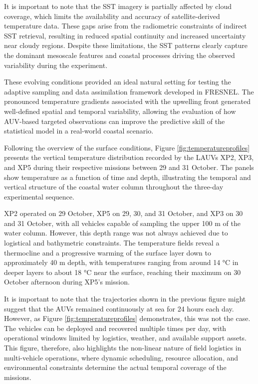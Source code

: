 It is important to note that the SST imagery is partially affected by cloud coverage, which limits the availability and accuracy of satellite-derived temperature data. These gaps arise from the radiometric constraints of indirect SST retrieval, resulting in reduced spatial continuity and increased uncertainty near cloudy regions. Despite these limitations, the SST patterns clearly capture the dominant mesoscale features and coastal processes driving the observed variability during the experiment.

These evolving conditions provided an ideal natural setting for testing the adaptive sampling and data assimilation framework developed in FRESNEL. The pronounced temperature gradients associated with the upwelling front generated well-defined spatial and temporal variability, allowing the evaluation of how AUV-based targeted observations can improve the predictive skill of the statistical model in a real-world coastal scenario.

Following the overview of the surface conditions, Figure \ref{fig:temperatureprofiles} presents the vertical temperature distribution recorded by the LAUVs XP2, XP3, and XP5 during their respective missions between 29 and 31 October. The panels show temperature as a function of time and depth, illustrating the temporal and vertical structure of the coastal water column throughout the three-day experimental sequence.

XP2 operated on 29 October, XP5 on 29, 30, and 31 October, and XP3 on 30 and 31 October, with all vehicles capable of sampling the upper 100 m of the water column. However, this depth range was not always achieved due to logistical and bathymetric constraints. The temperature fields reveal a thermocline and a progressive warming of the surface layer down to approximately 40 m depth, with temperatures ranging from around 14 °C in deeper layers to about 18 °C near the surface, reaching their maximum on 30 October afternoon during XP5’s mission.

It is important to note that the trajectories shown in the previous figure might suggest that the AUVs remained continuously at sea for 24 hours each day. However, as Figure \ref{fig:temperatureprofiles} demonstrates, this was not the case. The vehicles can be deployed and recovered multiple times per day, with operational windows limited by logistics, weather, and available support assets. This figure, therefore, also highlights the non-linear nature of field logistics in multi-vehicle operations, where dynamic scheduling, resource allocation, and environmental constraints determine the actual temporal coverage of the missions.

